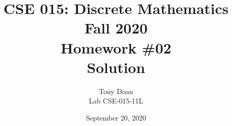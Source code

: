 \documentclass[11pt]{article}
\begin{document}
\author{Tony Doan\\
Lab CSE-015-11L }

\title{CSE 015: Discrete Mathematics\\
Fall 2020\\
Homework \#02\\
Solution}

\date{September 20, 2020}
\maketitle

\end{document}
